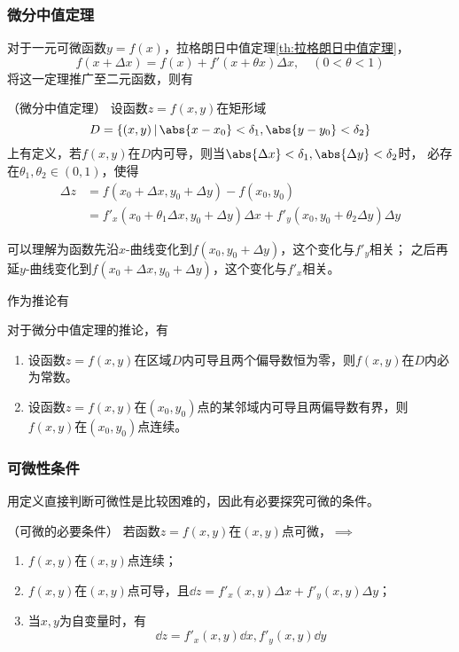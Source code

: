 \subsubsection{微分中值定理}
对于一元可微函数$y=f(x)$，拉格朗日中值定理\ref{th:拉格朗日中值定理}，
\[ f(x+\Delta x) = f(x) + f'(x+\theta x)\Delta x,\quad (0<\theta<1) \]
将这一定理推广至二元函数，则有
\begin{theorem}
    （微分中值定理）
    \label{th:微分中值定理}
    设函数$z=f(x,y)$在矩形域
    \[ D = \{(x,y)\,|\,\abs{x-x_0}<\delta_1, \abs{y-y_0} < \delta_2 \} \]
    上有定义，若$f(x,y)$在$D$内可导，则当$\abs{\Delta x}<\delta_1, \abs{\Delta y}<\delta_2$时，
    必存在$\theta_1,\theta_2\in(0,1)$，使得
    \begin{align*}
        \Delta z & = f(x_0+\Delta x, y_0 +\Delta y) - f(x_0,y_0)                                                 \\
                 & =f'_x(x_0+\theta_1\Delta x, y_0 + \Delta y) \Delta x + f'_y(x_0,y_0+\theta_2\Delta y)\Delta y
    \end{align*}
\end{theorem}
可以理解为函数先沿$x$-曲线变化到$f(x_0,y_0+\Delta y)$，这个变化与$f'_y$相关；
之后再延$y$-曲线变化到$f(x_0+\Delta x, y_0+\Delta y)$，这个变化与$f'_x$相关。

作为推论有
\begin{theorem}
    对于微分中值定理的推论，有
    \begin{enumerate}[(1)]
        \item 设函数$z=f(x,y)$在区域$D$内可导且两个偏导数恒为零，则$f(x,y)$在$D$内必为常数。
        \item 设函数$z=f(x,y)$在$(x_0,y_0)$点的某邻域内可导且两偏导数有界，则$f(x,y)$在$(x_0,y_0)$点连续。
    \end{enumerate}
\end{theorem}

\subsubsection{可微性条件}
用定义直接判断可微性是比较困难的，因此有必要探究可微的条件。
\begin{theorem}
    （可微的必要条件）
    若函数$z=f(x,y)$在$(x,y)$点可微，$\implies$
    \begin{enumerate}[(1)]
        \item $f(x,y)$在$(x,y)$点连续；
        \item $f(x,y)$在$(x,y)$点可导，且$\dd{z} = f'_x(x,y)\Delta x+ f'_y(x,y)\Delta y$；
        \item 当$x,y$为自变量时，有
              \[ \dd{z} = f'_x(x,y)\dd{x}, f'_y(x,y)\dd{y} \]
    \end{enumerate}
\end{theorem}

